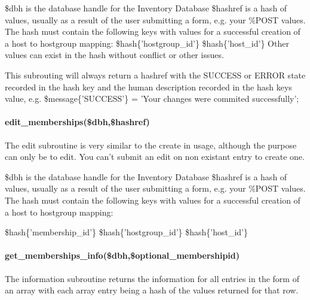 \documentclass{book}
\begin{document}
\$dbh is the database handle for the Inventory Database \$hashref is a hash of values, usually as a result of the user submitting a form, e.g. your \%POST values. The hash must contain the following keys with values for a successful creation of a host to hostgroup mapping: \$hash\{'hostgroup\_id'\} \$hash\{'host\_id'\} Other values can exist in the hash without conflict or other issues.



This subrouting will always return a hashref with the SUCCESS or ERROR state recorded in the hash key and the human description recorded in the hash keys value, e.g. \$message\{'SUCCESS'\} = 'Your changes were commited successfully';


\paragraph*{edit\protect\_memberships(\$dbh,\$hashref)}
\label{Inventory::Memberships_edit_memberships_dbh_hashref_}
\hypertarget{Inventory::Memberships_edit_memberships_dbh_hashref_}{}



The edit subroutine is very similar to the create in usage, although the purpose can only be to edit. You can't submit an edit on non existant entry to create one.



\$dbh is the database handle for the Inventory Database \$hashref is a hash of values, usually as a result of the user submitting a form, e.g. your \%POST values. The hash must contain the following keys with values for a successful creation of a host to hostgroup mapping:



\$hash\{'membership\_id'\} \$hash\{'hostgroup\_id'\} \$hash\{'host\_id'\}


\paragraph*{get\protect\_memberships\protect\_info(\$dbh,\$optional\protect\_membershipid)}
\label{Inventory::Memberships_get_memberships_info_dbh_optional_membershipid_}
\hypertarget{Inventory::Memberships_get_memberships_info_dbh_optional_membershipid_}{}



The information subroutine returns the information for all entries in the form of an array with each array entry being a hash of the values returned for that row.
\end{document}
